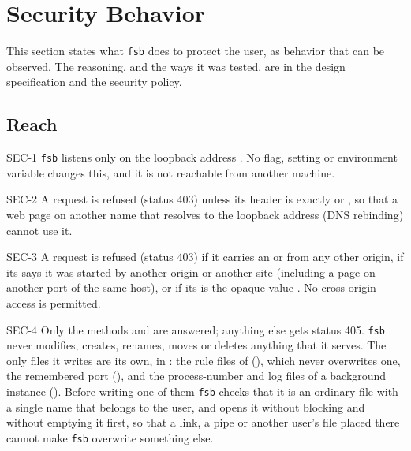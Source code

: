 \section{Security Behavior}
\label{sec:security}

This section states what \texttt{fsb} does to protect the user, as behavior that can
be observed.  The reasoning, and the ways it was tested, are in the design
specification and the security policy.

\subsection{Reach}

\begin{req}{SEC-1}
\texttt{fsb} listens only on the loopback address .  No flag,
setting or environment variable changes this, and it is not reachable from another
machine.
\end{req}

\begin{req}{SEC-2}
A request is refused (status 403) unless its  header is exactly
 or , so that a web page on another name
that resolves to the loopback address (DNS rebinding) cannot use it.
\end{req}

\begin{req}{SEC-3}
A request is refused (status 403) if it carries an  or 
from any other origin, if its  says it was started by another
origin or another site (including a page on another port of the same host), or if
its  is the opaque value .  No cross-origin access is
permitted.
\end{req}

\begin{req}{SEC-4}
Only the methods  and  are answered; anything else gets status
405.  \texttt{fsb} never modifies, creates, renames, moves or deletes anything that
it serves.  The only files it writes are its own, in : the
rule files of  (), which never overwrites one, the remembered
port (), and the process-number and log files of a background instance
().  Before writing one of them \texttt{fsb} checks that it is an
ordinary file with a single name that belongs to the user, and opens it without
blocking and without emptying it first, so that a link, a pipe or another user's file
placed there cannot make \texttt{fsb} overwrite something else.
\end{req}

